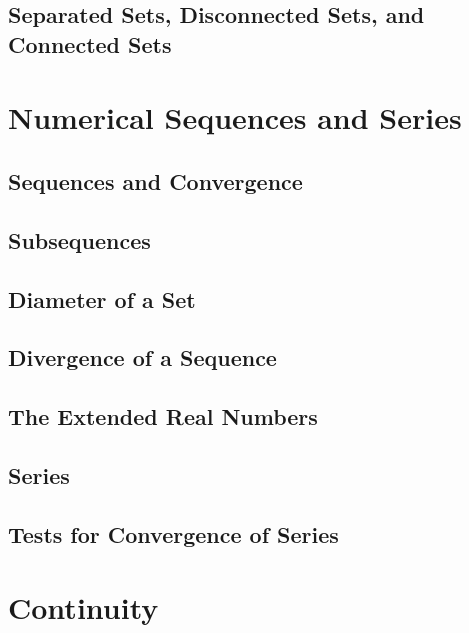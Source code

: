 \documentclass[a4paper, openany]{book}
\begin{document}
\section{Separated Sets, Disconnected Sets, and Connected Sets}

\newpage

\chapter{Numerical Sequences and Series}
\section{Sequences and Convergence}

\newpage

\section{Subsequences}

\newpage

\section{Diameter of a Set}

\newpage

\section{Divergence of a Sequence}

\newpage

\section{The Extended Real Numbers}

\newpage

\section{Series}

\newpage

\section{Tests for Convergence of Series}

\newpage

\chapter{Continuity}
\end{document}
